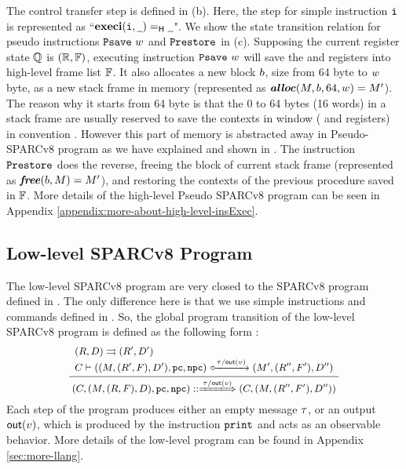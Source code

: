 The control transfer step is defined in  
\Fig{\ref{fig:selected-opsem-high-level-prog}} (b). 
Here, the step for simple instruction $\texttt{i}{}$ is 
represented as ``$\textbf{execi}{{(\texttt{i}{}, \underline{\ \,})}} =_{\textsf{H}} {\underline{\ \,}}$". 
We show the state transition relation for pseudo instructions 
$\texttt{Psave} \ w$ and $\texttt{Prestore}$ in 
\Fig{\ref{fig:selected-opsem-high-level-prog}} (c). 
Supposing the current register state $\mathbb{Q}$ is 
$(\mathbb{R}, \mathbb{F})$, executing instruction
$\texttt{Psave} \ w$ will save the \localRN{} and \inRN{} registers 
into high-level frame list $\mathbb{F}$. It also allocates 
a new block $b$, size from 64 byte to $w$ byte, 
as a new stack frame in memory 
(represented as $\textbf{\textit{alloc}}(M, b, 64, w) = M'$). 
The reason why it starts from 64 byte is that the 0 to 64 bytes 
(16 words) in a stack frame are usually reserved to save 
the contexts in window (\localRN{} and \inRN{} registers)
in convention \cite{sparc}.  
However this part of memory is abstracted away in 
Pseudo-SPARCv8 program as we have explained and shown in 
\Fig{\ref{fig:Abstraction of Register Windows and Memory}}.
The instruction $\texttt{Prestore}$ does the reverse, 
freeing the block of current stack frame
(represented as $\textbf{\textit{free}}(b, M) = M'$), and 
restoring the contexts of the previous procedure saved in $\mathbb{F}$. 
More details of the high-level Pseudo 
SPARCv8 program can be seen in Appendix \ref{appendix:more-about-high-level-insExec}.

\subsection{Low-level SPARCv8 Program}
\label{subsec:low-level SPARCv8 Program}

The low-level SPARCv8 program are very closed to the SPARCv8 program 
defined in \Fig{\ref{fig:Machine States and Language for SPARC Code}}. 
The only difference here is that we use simple instructions and commands 
defined in \Fig{\ref{fig:syntax-of-concur-pseudo-sparc}}. So, the global 
program transition of the low-level SPARCv8 program is defined as 
the following form : 
\[
    \small
    \infer
    {
        \LGlobTrans{(\code, (\Mem, (\RFile, \Wstack), \DBuf), \pc, \npc)}
            { \empmsg / \outEvt{\val} }
            {(\code, (\Mem, (\RFile'', \Wstack'), \DBuf''))}
    }
    {
        \begin{array}{l}
            \Dstep{(\RFile, \DBuf)}{(\RFile', \DBuf')} \\
            \llocalstep{\code}
                {((\Mem, (\RFile', \Wstack), \DBuf'), \pc, \npc)}
                { \empmsg / \outEvt{\val} }
                {(\Mem', (\RFile'', \Wstack'), \DBuf'')}
        \end{array}
    }
\]
Each step of the program produces either an empty message $\tau$, or  
an output $\textsf{out}({v})$, which is produced by the instruction 
$\texttt{print}$ and acts as an observable behavior. 
More details of the low-level program can be found in Appendix 
\ref{sec:more-llang}. 

